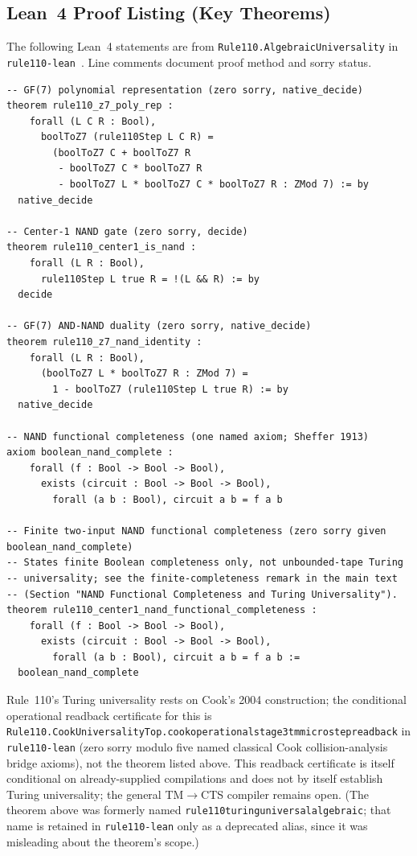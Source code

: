 \documentclass[11pt]{article}
\theoremstyle{remark}
\newcommand{\lean}[1]{%
  \penalty-100
  \begingroup\def\_{\textunderscore\allowbreak}\texttt{#1}\endgroup}
\begin{document}
\newpage
\begin{appendices}

\section{Lean~4 Proof Listing (Key Theorems)}
\label{app:lean_listing}

The following Lean~4 statements are from
\lean{Rule110.AlgebraicUniversality} in \texttt{rule110-lean}~\cite{rule110-lean}.
Line comments document proof method and sorry status.

\begin{verbatim}
-- GF(7) polynomial representation (zero sorry, native_decide)
theorem rule110_z7_poly_rep :
    forall (L C R : Bool),
      boolToZ7 (rule110Step L C R) =
        (boolToZ7 C + boolToZ7 R
         - boolToZ7 C * boolToZ7 R
         - boolToZ7 L * boolToZ7 C * boolToZ7 R : ZMod 7) := by
  native_decide

-- Center-1 NAND gate (zero sorry, decide)
theorem rule110_center1_is_nand :
    forall (L R : Bool),
      rule110Step L true R = !(L && R) := by
  decide

-- GF(7) AND-NAND duality (zero sorry, native_decide)
theorem rule110_z7_nand_identity :
    forall (L R : Bool),
      (boolToZ7 L * boolToZ7 R : ZMod 7) =
        1 - boolToZ7 (rule110Step L true R) := by
  native_decide

-- NAND functional completeness (one named axiom; Sheffer 1913)
axiom boolean_nand_complete :
    forall (f : Bool -> Bool -> Bool),
      exists (circuit : Bool -> Bool -> Bool),
        forall (a b : Bool), circuit a b = f a b

-- Finite two-input NAND functional completeness (zero sorry given boolean_nand_complete)
-- States finite Boolean completeness only, not unbounded-tape Turing
-- universality; see the finite-completeness remark in the main text
-- (Section "NAND Functional Completeness and Turing Universality").
theorem rule110_center1_nand_functional_completeness :
    forall (f : Bool -> Bool -> Bool),
      exists (circuit : Bool -> Bool -> Bool),
        forall (a b : Bool), circuit a b = f a b :=
  boolean_nand_complete
\end{verbatim}

Rule~110's Turing universality rests on Cook's 2004 construction; the conditional
operational readback certificate for this is
\lean{Rule110.CookUniversalityTop.cook\_operational\_stage3\_tm\_microstep\_readback} in
\texttt{rule110-lean} (zero sorry modulo five named classical Cook
collision-analysis bridge axioms), not the theorem listed above.  This readback
certificate is itself conditional on already-supplied compilations and does not by
itself establish Turing universality; the general TM$\to$CTS compiler remains open.
(The theorem above was formerly named \lean{rule110\_turing\_universal\_algebraic};
that name is retained in \texttt{rule110-lean} only as a deprecated alias, since it
was misleading about the theorem's scope.)

\end{appendices}
\end{document}
